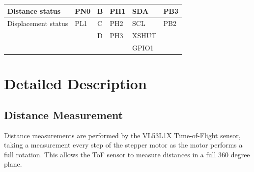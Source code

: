 \documentclass[12pt]{article}
\begin{document}
\begin{table}[h]
\begin{tabular}{|l|l|l|l|l|l|}
    Distance status               & PN0                         & B                                                                          & PH1                                                                                & SDA                                                                       & PB3                                                                                \\ \hline
    Displacement status           & PL1                         & C                                                                          & PH2                                                                                & SCL                                                                       & PB2                                                                                \\ \hline
                                  &                             & D                                                                          & PH3                                                                                & XSHUT                                                                     &                                                                                    \\ \hline
                                  &                             &                                                                            &                                                                                    & GPIO1                                                                     &                                                                                    \\ \hline
    \end{tabular}
\end{table}
\newpage
\section*{Detailed Description}
\subsection*{Distance Measurement}
\indent \indent Distance measurements are performed by the VL53L1X Time-of-Flight sensor, taking a measurement every step of the stepper motor as the motor performs a full rotation. This allows the ToF sensor to measure distances in a full 360 degree plane.
\end{document}

